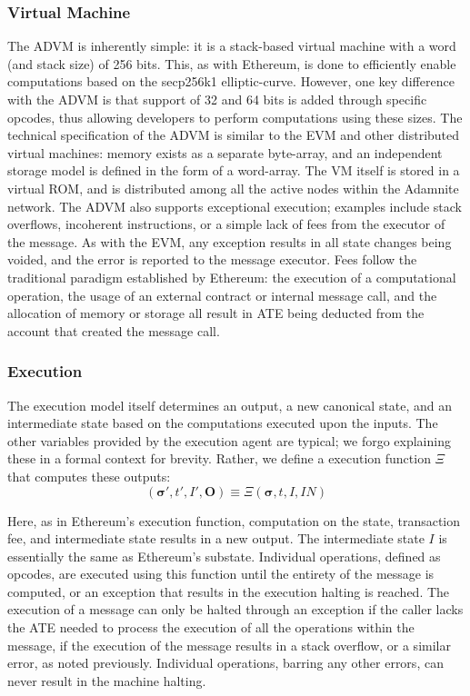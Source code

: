 \documentclass[conference]{IEEEtran}
\begin{document}
\subsubsection{Virtual Machine}
The ADVM is inherently simple: it is a stack-based virtual machine with a word (and stack size) of 256 bits. This, as with Ethereum, is done to efficiently enable computations based on the secp256k1 elliptic-curve. However, one key difference with the ADVM is that support of 32 and 64 bits is added through specific opcodes, thus allowing developers to perform computations using these sizes. The technical specification of the ADVM is similar to the EVM and other distributed virtual machines: memory exists as a separate byte-array, and an independent storage model is defined in the form of a word-array. The VM itself is stored in a virtual ROM, and is distributed among all the active nodes within the Adamnite network. The ADVM also supports exceptional execution; examples include stack overflows, incoherent instructions, or a simple lack of fees from the executor of the message. As with the EVM, any exception results in all state changes being voided, and the error is reported to the message executor. Fees follow the traditional paradigm established by Ethereum: the execution of a computational operation, the usage of an external contract or internal message call, and the allocation of memory or storage all result in ATE being deducted from the account that created the message call. 

\subsubsection{Execution}
The execution model itself determines an output, a new canonical state, and an intermediate state based on the computations executed upon the inputs. The other variables provided by the execution agent are typical; we forgo explaining these in a formal context for brevity. Rather, we define a execution function $\Xi$ that computes these outputs:
\begin{equation}
(\boldsymbol{\sigma}', t', I', \mathbf{O}) \equiv \Xi(\boldsymbol{\sigma}, t, I, IN)
\end{equation}

Here, as in Ethereum's execution function, computation on the state, transaction fee, and intermediate state results in a new output. The intermediate state $I$ is essentially the same as Ethereum's substate. Individual operations, defined as opcodes, are executed using this function until the entirety of the message is computed, or an exception that results in the execution halting is reached. The execution of a message can only be halted through an exception if the caller lacks the ATE needed to process the execution of all the operations within the message, if the execution of the message results in a stack overflow, or a similar error, as noted previously. Individual operations, barring any other errors, can never result in the machine halting.\\
\end{document}

